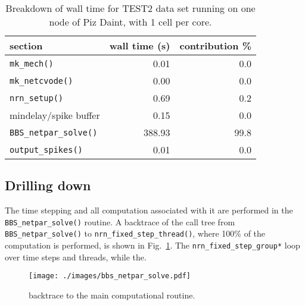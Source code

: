 \documentclass[11pt,a4paper]{article}
\newcommand{\lst}[1]{\lstinline!#1!} %
\newcommand{\fig}[1]{Fig.~\ref{#1}} %
\begin{document}
\begin{table}[htp!]
    \centering
\begin{tabular}{lrr}
\hline
section                    &    wall time (s) & contribution \% \\
\hline
\lst{mk_mech()}            &    0.01   &    0.0\\
\lst{mk_netcvode()}        &    0.00   &    0.0\\
\lst{nrn_setup()}          &    0.69   &    0.2\\
mindelay/spike buffer      &    0.15   &    0.0\\
\lst{BBS_netpar_solve()}   &    388.93 &   99.8\\
\lst{output_spikes()}      &    0.01   &    0.0\\
\hline
\end{tabular}
\label{tbl:wallmain}
\caption{Breakdown of wall time for TEST2 data set running on one node of Piz Daint, with 1 cell per core.}
\end{table}

\subsection{Drilling down}
The time stepping and all computation associated with it are performed in the \lst{BBS_netpar_solve()} routine. A backtrace of the call tree from \lst{BBS_netpar_solve()} to \lst{nrn_fixed_step_thread()}, where 100\% of the computation is performed, is shown in \fig{fig:bbsnetpar}. The \lst{nrn_fixed_step_group*} loop over time steps and threads, while the.

\begin{figure}[htp!]
\centering
\texttt{[image: ./images/bbs\_netpar\_solve.pdf]}
\caption{backtrace to the main computational routine.}
\label{fig:bbsnetpar}
\end{figure}
\end{document}
